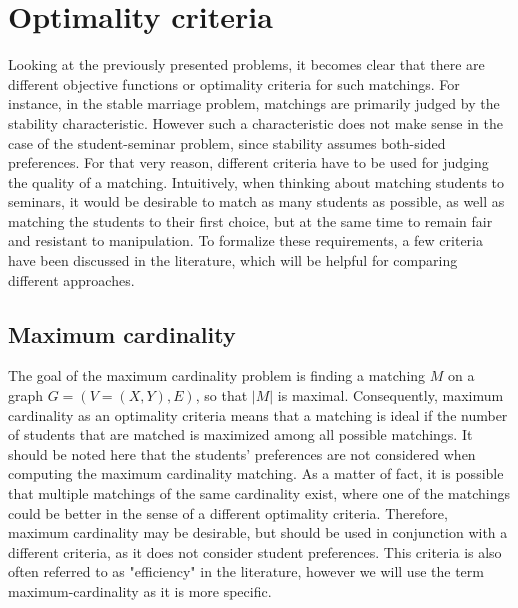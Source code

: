 \section{Optimality criteria}\label{sec:optimality}
Looking at the previously presented problems, it becomes clear that there are different objective functions or optimality criteria for such matchings. For instance, in the stable marriage problem, matchings are primarily judged by the stability characteristic. However such a characteristic does not make sense in the case of the student-seminar problem, since stability assumes both-sided preferences. For that very reason, different criteria have to be used for judging the quality of a matching.
\newline
Intuitively, when thinking about matching students to seminars, it would be desirable to match as many students as possible, as well as matching the students to their first choice, but at the same time to remain fair and resistant to manipulation. To formalize these requirements, a few criteria have been discussed in the literature, which will be helpful for comparing different approaches. 

\subsection{Maximum cardinality}
The goal of the maximum cardinality problem is finding a matching $M$ on a graph $G=(V=(X, Y), E)$, so that $|M|$ is maximal.\cite{GraphTheoryIntro} Consequently, maximum cardinality as an optimality criteria means that a matching is ideal if the number of students that are matched is maximized among all possible matchings. It should be noted here that the students' preferences are not considered when computing the maximum cardinality matching. As a matter of fact, it is possible that multiple matchings of the same cardinality exist, where one of the matchings could be better in the sense of a different optimality criteria. Therefore, maximum cardinality may be desirable, but should be used in conjunction with a different criteria, as it does not consider student preferences. This criteria is also often referred to as "efficiency" in the literature, however we will use the term maximum-cardinality as it is more specific.

